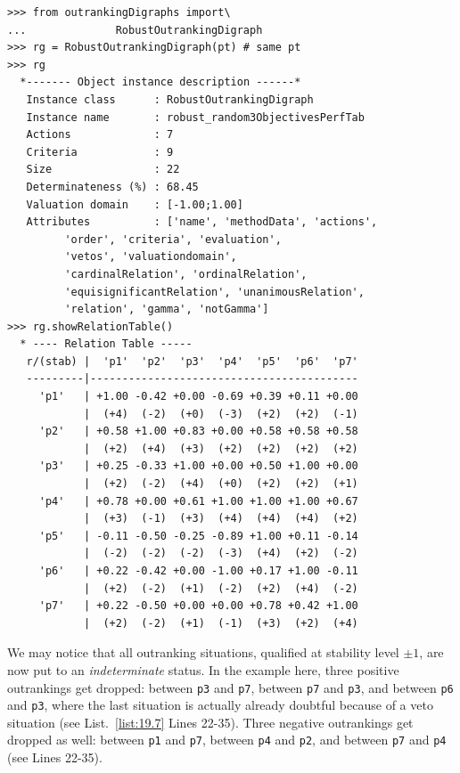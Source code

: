 \begin{lstlisting}[caption={Computing a robust outranking digraph},label=list:19.7]
>>> from outrankingDigraphs import\
...              RobustOutrankingDigraph
>>> rg = RobustOutrankingDigraph(pt) # same pt
>>> rg
  *------- Object instance description ------*
   Instance class      : RobustOutrankingDigraph
   Instance name       : robust_random3ObjectivesPerfTab
   Actions             : 7
   Criteria            : 9
   Size                : 22
   Determinateness (%) : 68.45
   Valuation domain    : [-1.00;1.00]
   Attributes          : ['name', 'methodData', 'actions',
         'order', 'criteria', 'evaluation',
         'vetos', 'valuationdomain',
         'cardinalRelation', 'ordinalRelation',
         'equisignificantRelation', 'unanimousRelation',
         'relation', 'gamma', 'notGamma']
>>> rg.showRelationTable()
  * ---- Relation Table -----
   r/(stab) |  'p1'  'p2'  'p3'  'p4'  'p5'  'p6'  'p7'   
   ---------|------------------------------------------
     'p1'   | +1.00 -0.42 +0.00 -0.69 +0.39 +0.11 +0.00  
            |  (+4)  (-2)  (+0)  (-3)  (+2)  (+2)  (-1)  
     'p2'   | +0.58 +1.00 +0.83 +0.00 +0.58 +0.58 +0.58  
            |  (+2)  (+4)  (+3)  (+2)  (+2)  (+2)  (+2)  
     'p3'   | +0.25 -0.33 +1.00 +0.00 +0.50 +1.00 +0.00  
            |  (+2)  (-2)  (+4)  (+0)  (+2)  (+2)  (+1)  
     'p4'   | +0.78 +0.00 +0.61 +1.00 +1.00 +1.00 +0.67  
            |  (+3)  (-1)  (+3)  (+4)  (+4)  (+4)  (+2)  
     'p5'   | -0.11 -0.50 -0.25 -0.89 +1.00 +0.11 -0.14  
            |  (-2)  (-2)  (-2)  (-3)  (+4)  (+2)  (-2)  
     'p6'   | +0.22 -0.42 +0.00 -1.00 +0.17 +1.00 -0.11  
            |  (+2)  (-2)  (+1)  (-2)  (+2)  (+4)  (-2)  
     'p7'   | +0.22 -0.50 +0.00 +0.00 +0.78 +0.42 +1.00  
            |  (+2)  (-2)  (+1)  (-1)  (+3)  (+2)  (+4)  
\end{lstlisting}
We may notice that all outranking situations, qualified at stability level $\pm 1$, are now put to an \emph{indeterminate} status. In the example here, three positive outrankings get dropped: between \texttt{p3} and \texttt{p7}, between \texttt{p7} and \texttt{p3}, and between \texttt{p6} and \texttt{p3}, where the last situation is actually already doubtful because of a veto situation (see List.~\vref{list:19.7} Lines 22-35). Three negative outrankings get dropped as well: between \texttt{p1} and \texttt{p7}, between \texttt{p4} and \texttt{p2}, and between \texttt{p7} and \texttt{p4} (see Lines 22-35).

